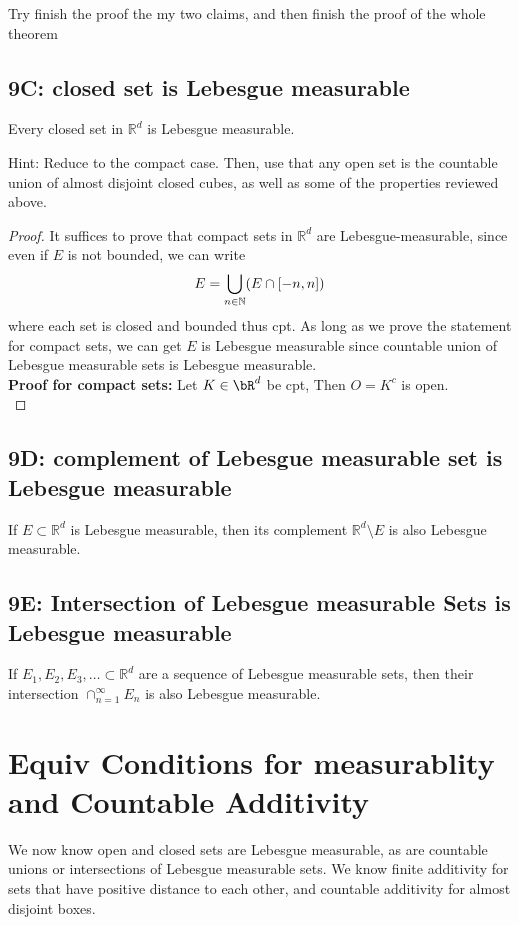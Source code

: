 \documentclass[lang=cn,11pt]{template}
\begin{document}
Try finish the proof the my two claims, and then finish the proof of the whole theorem
\section*{9C: closed set is Lebesgue measurable}
\begin{theorem}
Every closed set in \( \mathbb{R}^d \) is Lebesgue measurable.
\end{theorem}
Hint: Reduce to the compact case. Then, use that any open set is the countable union of almost disjoint closed cubes, as well as some of the properties reviewed above.
\begin{proof}
It suffices to prove that compact sets in $\mathbb{R}^d$ are Lebesgue-measurable, since even if $E$ is not bounded, we can write    $$E =  \displaystyle\bigcup_{n \in \mathbb{N}} (E \cap [-n, n]) $$
where each set is closed and bounded thus cpt. As long as we prove the statement for compact sets, we can get $E$ is Lebesgue measurable since countable union of Lebesgue measurable sets is Lebesgue measurable.\\
\textbf{Proof for compact sets:} Let $K \in \bR ^d $ be cpt, Then $O = K^c$ is open.\\

\end{proof}


\section*{9D: complement of Lebesgue measurable set is Lebesgue measurable} 
\begin{theorem}
If \( E \subset \mathbb{R}^d \) is Lebesgue measurable, then its complement \( \mathbb{R}^d \setminus E \) is also Lebesgue measurable.
\end{theorem}


\section*{9E: Intersection of Lebesgue measurable Sets is Lebesgue measurable}
\begin{theorem}
If \( E_1, E_2, E_3, \ldots \subset \mathbb{R}^d \) are a sequence of Lebesgue measurable sets, then their intersection \( \cap_{n=1}^{\infty} E_n \) is also Lebesgue measurable.
\end{theorem}




\chapter{Equiv Conditions for measurablity and Countable Additivity}
\begin{remark}
We now know open and closed sets are Lebesgue measurable, as are countable unions or intersections of Lebesgue measurable sets. 
We know finite additivity for sets that have positive distance to each other, and countable additivity for almost disjoint boxes.
\end{remark}
\end{document}
